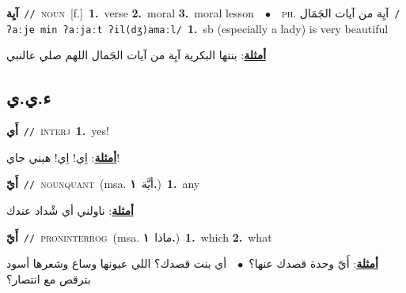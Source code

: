 \documentclass[10pt,a4paper,twoside]{article} %
\begin{document}
\begin{multicols}{2}
{\setlength\topsep{0pt}\textbf{\foreignlanguage{arabic}{آيِة}}\ {\color{gray}\texttt{//}\color{black}}\ \textsc{noun}\ [f.]\ \textbf{1.}~verse  \textbf{2.}~moral  \textbf{3.}~moral lesson\ \ $\bullet$\ \ \textsc{ph.} \color{gray} \foreignlanguage{arabic}{آيِة من آيات الجَمَال}\color{black}\ {\color{gray}\texttt{/{\sffamily ʔaːje min ʔaːjaːt ʔil(dʒ)amaːl}/}\color{black}}\ \textbf{1.}~sb (especially a lady) is very beautiful\  \begin{flushright}\color{gray}\foreignlanguage{arabic}{\textbf{\underline{\foreignlanguage{arabic}{أمثلة}}}: بنتها البكرية آيِة من آيات الجَمال اللهم صلي عالنبي}\end{flushright}\color{black}} \vspace{2mm}

\vspace{-3mm}
\subsection*{\color{blue}\foreignlanguage{arabic}{ء.ي.ي}\color{blue}{ (ntws)}} 

{\setlength\topsep{0pt}\textbf{\foreignlanguage{arabic}{أَي}}\ {\color{gray}\texttt{//}\color{black}}\ \textsc{interj}\ \textbf{1.}~yes!\  \begin{flushright}\color{gray}\foreignlanguage{arabic}{\textbf{\underline{\foreignlanguage{arabic}{أمثلة}}}: اِي! اِي! هيني جاي!}\end{flushright}\color{black}} \vspace{2mm}

{\setlength\topsep{0pt}\textbf{\foreignlanguage{arabic}{أَيّ}}\ {\color{gray}\texttt{//}\color{black}}\ \textsc{noun\textunderscore quant}\ \color{gray}(msa. \foreignlanguage{arabic}{أيَّة}~\foreignlanguage{arabic}{\textbf{١.}})\color{black}\ \textbf{1.}~any\  \begin{flushright}\color{gray}\foreignlanguage{arabic}{\textbf{\underline{\foreignlanguage{arabic}{أمثلة}}}: ناولني أي شْداد عندك}\end{flushright}\color{black}} \vspace{2mm}

{\setlength\topsep{0pt}\textbf{\foreignlanguage{arabic}{أَيّ}}\ {\color{gray}\texttt{//}\color{black}}\ \textsc{pron\textunderscore interrog}\ \color{gray}(msa. \foreignlanguage{arabic}{ماذا}~\foreignlanguage{arabic}{\textbf{١.}})\color{black}\ \textbf{1.}~which  \textbf{2.}~what\  \begin{flushright}\color{gray}\foreignlanguage{arabic}{\textbf{\underline{\foreignlanguage{arabic}{أمثلة}}}: أَيّ وحدة قصدك عنها؟\ $\bullet$\ \  أي بنت قصدك؟ اللي عيونها وساع وشعرها أسود بترقص مع انتصار؟}\end{flushright}\color{black}} \vspace{2mm}

\end{multicols}
\end{document}
